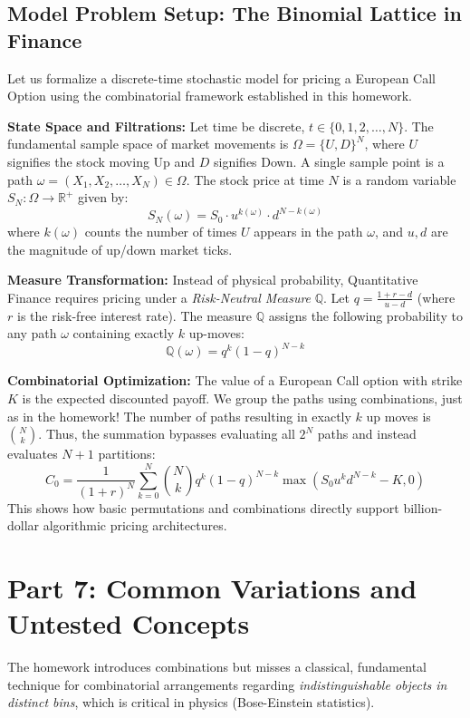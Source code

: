 \documentclass[11pt, letterpaper]{article}
\theoremstyle{definition}
\theoremstyle{remark}
\newcommand{\R}{\mathbb{R}}
\begin{document}
\subsection{Model Problem Setup: The Binomial Lattice in Finance}
Let us formalize a discrete-time stochastic model for pricing a European Call Option using the combinatorial framework established in this homework.

\textbf{State Space and Filtrations:}
Let time be discrete, $t \in \{0, 1, 2, \dots, N\}$. The fundamental sample space of market movements is $\Omega = \{U, D\}^N$, where $U$ signifies the stock moving Up and $D$ signifies Down.
A single sample point is a path $\omega = (X_1, X_2, \dots, X_N) \in \Omega$. 
The stock price at time $N$ is a random variable $S_N : \Omega \to \R^+$ given by:
\[ S_N(\omega) = S_0 \cdot u^{k(\omega)} \cdot d^{N - k(\omega)} \]
where $k(\omega)$ counts the number of times $U$ appears in the path $\omega$, and $u, d$ are the magnitude of up/down market ticks.

\textbf{Measure Transformation:}
Instead of physical probability, Quantitative Finance requires pricing under a \textit{Risk-Neutral Measure} $\mathbb{Q}$. Let $q = \frac{1+r-d}{u-d}$ (where $r$ is the risk-free interest rate). 
The measure $\mathbb{Q}$ assigns the following probability to any path $\omega$ containing exactly $k$ up-moves:
\[ \mathbb{Q}(\omega) = q^k (1-q)^{N-k} \]

\textbf{Combinatorial Optimization:}
The value of a European Call option with strike $K$ is the expected discounted payoff. We group the paths using combinations, just as in the homework! The number of paths resulting in exactly $k$ up moves is $\binom{N}{k}$. Thus, the summation bypasses evaluating all $2^N$ paths and instead evaluates $N+1$ partitions:
\[ C_0 = \frac{1}{(1+r)^N} \sum_{k=0}^{N} \binom{N}{k} q^k (1-q)^{N-k} \max(S_0 u^k d^{N-k} - K, 0) \]
This shows how basic permutations and combinations directly support billion-dollar algorithmic pricing architectures.

\newpage
\section{Part 7: Common Variations and Untested Concepts}

The homework introduces combinations but misses a classical, fundamental technique for combinatorial arrangements regarding \textit{indistinguishable objects in distinct bins}, which is critical in physics (Bose-Einstein statistics).
\end{document}
